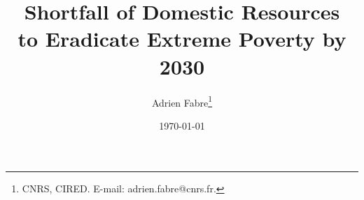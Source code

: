 % 
% 

% 


\title{Shortfall of Domestic Resources\\ to Eradicate Extreme Poverty by 2030} 

\author{Adrien Fabre\footnote{CNRS, CIRED. E-mail: adrien.fabre@cnrs.fr.}}

\date{\today} %



\sloppy
\maketitle




